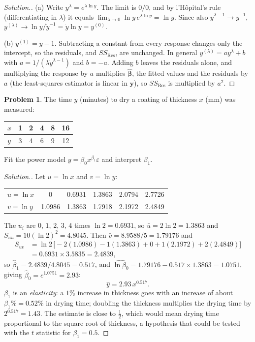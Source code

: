 \documentclass[11pt,a4paper]{article}
\numberwithin{equation}{section}
\theoremstyle{definition}
\newtheorem{problemx}{Problem}[subsection]
\newenvironment{problem}{\begin{problemx}}{\end{problemx}}
\newenvironment{solution}
  {\renewcommand{\qedsymbol}{}\begin{proof}[\textit{Solution}.]}
  {\end{proof}}
\begin{document}
\begin{solution}
(a) Write $y^\lambda = e^{\lambda\ln y}$. The limit is $0/0$, and by l'H\^opital's rule (differentiating
in $\lambda$) it equals $\lim_{\lambda \to 0}\ln y\,e^{\lambda\ln y} = \ln y$. Since also $\dot y^{\lambda - 1} \to \dot y^{-1}$,
$y^{(\lambda)} \to \ln y/\dot y^{-1} = \dot y\ln y = y^{(0)}$.

(b) $y^{(1)} = y - 1$. Subtracting a constant from every response changes only the intercept,
so the residuals, and $SS_{\mathrm{Res}}$, are unchanged. In general
$y^{(\lambda)} = a y^\lambda + b$ with $a = 1/(\lambda\dot y^{\lambda - 1})$ and $b = -a$. Adding $b$ leaves the
residuals alone, and multiplying the response by $a$ multiplies $\hat{\boldsymbol\beta}$, the fitted
values and the residuals by $a$ (the least-squares estimator is linear in $\mathbf{y}$), so
$SS_{\mathrm{Res}}$ is multiplied by $a^2$.
\end{solution}

\begin{problem}\label{prob:power}
The time $y$ (minutes) to dry a coating of thickness $x$ (mm) was measured:
\begin{center}
\begin{tabular}{l|ccccc}
$x$ & 1 & 2 & 4 & 8 & 16 \\
\hline
$y$ & 3 & 4 & 6 & 9 & 12 \\
\end{tabular}
\end{center}
Fit the power model $y = \beta_0 x^{\beta_1}\varepsilon$ and interpret $\beta_1$.
\end{problem}

\begin{solution}
Let $u = \ln x$ and $v = \ln y$:
\begin{center}
\begin{tabular}{l|ccccc}
$u = \ln x$ & 0 & 0.6931 & 1.3863 & 2.0794 & 2.7726 \\
$v = \ln y$ & 1.0986 & 1.3863 & 1.7918 & 2.1972 & 2.4849 \\
\end{tabular}
\end{center}
The $u_i$ are $0$, $1$, $2$, $3$, $4$ times $\ln 2 = 0.6931$, so $\bar u = 2\ln 2 = 1.3863$ and
$S_{uu} = 10(\ln 2)^2 = 4.8045$. Then $\bar v = 8.9588/5 = 1.79176$ and
\begin{align*}
S_{uv} &= \ln 2\,\bigl[-2(1.0986) - 1(1.3863) + 0 + 1(2.1972) + 2(2.4849)\bigr] \\
&= 0.6931 \times 3.5835 = 2.4839 ,
\end{align*}
so $\hat\beta_1 = 2.4839/4.8045 = 0.517$, and $\widehat{\ln\beta_0} = 1.79176 - 0.517 \times 1.3863 = 1.0751$,
giving $\hat\beta_0 = e^{1.0751} = 2.93$:
\[
\hat y = 2.93\,x^{0.517} .
\]
$\beta_1$ is an \emph{elasticity}: a $1\%$ increase in thickness goes with an increase of about
$\beta_1\% = 0.52\%$ in drying time; doubling the thickness multiplies the drying time by
$2^{0.517} = 1.43$. The estimate is close to $\frac12$, which would mean drying time proportional
to the square root of thickness, a hypothesis that could be tested with the $t$ statistic for
$\beta_1 = 0.5$.
\end{solution}
\end{document}
